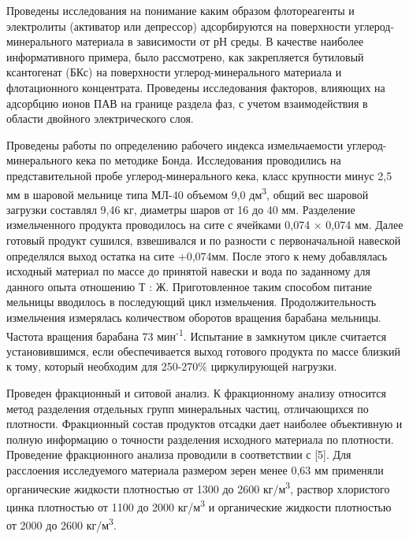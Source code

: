 Проведены исследования на понимание каким образом флотореагенты и
электролиты (активатор или депрессор) адсорбируются на поверхности
углерод-минерального материала в зависимости от рН среды. В качестве
наиболее информативного примера, было рассмотрено, как закрепляется
бутиловый ксантогенат (БКс) на поверхности углерод-минерального
материала и флотационного концентрата. Проведены исследования факторов,
влияющих на адсорбцию ионов ПАВ на границе раздела фаз, с учетом
взаимодействия в области двойного электрического слоя.

Проведены работы по определению рабочего индекса измельчаемости
углерод-минерального кека по методике Бонда. Исследования проводились на
представительной пробе углерод-минерального кека, класс крупности минус
2,5 мм в шаровой мельнице типа МЛ-40 объемом 9,0 дм\textsuperscript{3},
общий вес шаровой загрузки составлял 9,46 кг, диаметры шаров от 16 до 40
мм. Разделение измельченного продукта проводилось на сите с ячейками
0,074 × 0,074 мм. Далее готовый продукт сушился, взвешивался и по
разности с первоначальной навеской определялся выход остатка на сите
+0,074мм. После этого к нему добавлялась исходный материал по массе до
принятой навески и вода по заданному для данного опыта отношению Т : Ж.
Приготовленное таким способом питание мельницы вводилось в последующий
цикл измельчения. Продолжительность измельчения измерялась количеством
оборотов вращения барабана мельницы. Частота вращения барабана 73
мин\textsuperscript{-1}. Испытание в замкнутом цикле считается
установившимся, если обеспечивается выход готового продукта по массе
близкий к тому, который необходим для 250-270\% циркулирующей нагрузки.

Проведен фракционный и ситовой анализ. К фракционному анализу относится
метод разделения отдельных групп минеральных ча­стиц, отличающихся по
плотности. Фракцион­ный состав продуктов отсадки дает наиболее
объективную и полную информацию о точности разделения исходного
мате­риала по плотности. Проведение фракционного анализа проводили в
соответствии с {[}5{]}. Для расслоения исследуемого материала размером
зерен менее 0,63 мм применяли органические жидкости плотностью от 1300
до 2600 кг/м\textsuperscript{3}, раствор хлористого цинка плотностью от
1100 до 2000 кг/м\textsuperscript{3} и органические жидкости плотностью
от 2000 до 2600 кг/м\textsuperscript{3}.

